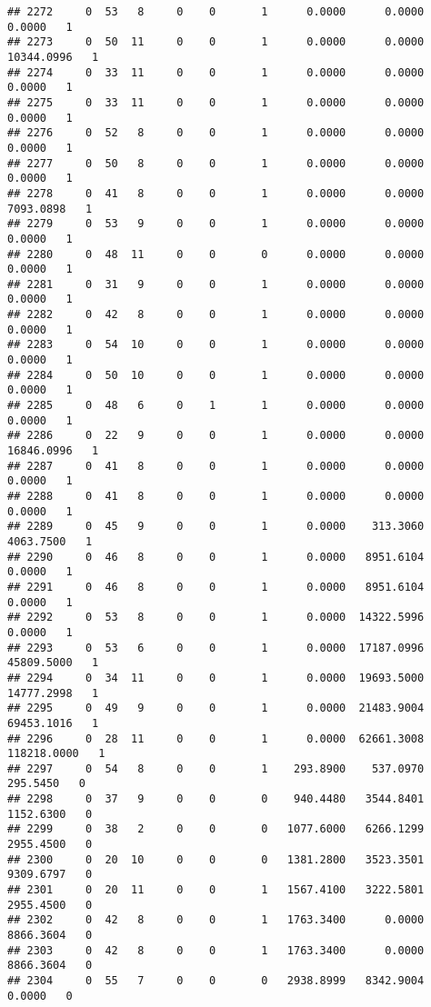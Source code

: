 \documentclass[
]{article}
\begin{document}
\begin{enumerate}
\begin{verbatim}
## 2272     0  53   8     0    0       1      0.0000      0.0000      0.0000   1
## 2273     0  50  11     0    0       1      0.0000      0.0000  10344.0996   1
## 2274     0  33  11     0    0       1      0.0000      0.0000      0.0000   1
## 2275     0  33  11     0    0       1      0.0000      0.0000      0.0000   1
## 2276     0  52   8     0    0       1      0.0000      0.0000      0.0000   1
## 2277     0  50   8     0    0       1      0.0000      0.0000      0.0000   1
## 2278     0  41   8     0    0       1      0.0000      0.0000   7093.0898   1
## 2279     0  53   9     0    0       1      0.0000      0.0000      0.0000   1
## 2280     0  48  11     0    0       0      0.0000      0.0000      0.0000   1
## 2281     0  31   9     0    0       1      0.0000      0.0000      0.0000   1
## 2282     0  42   8     0    0       1      0.0000      0.0000      0.0000   1
## 2283     0  54  10     0    0       1      0.0000      0.0000      0.0000   1
## 2284     0  50  10     0    0       1      0.0000      0.0000      0.0000   1
## 2285     0  48   6     0    1       1      0.0000      0.0000      0.0000   1
## 2286     0  22   9     0    0       1      0.0000      0.0000  16846.0996   1
## 2287     0  41   8     0    0       1      0.0000      0.0000      0.0000   1
## 2288     0  41   8     0    0       1      0.0000      0.0000      0.0000   1
## 2289     0  45   9     0    0       1      0.0000    313.3060   4063.7500   1
## 2290     0  46   8     0    0       1      0.0000   8951.6104      0.0000   1
## 2291     0  46   8     0    0       1      0.0000   8951.6104      0.0000   1
## 2292     0  53   8     0    0       1      0.0000  14322.5996      0.0000   1
## 2293     0  53   6     0    0       1      0.0000  17187.0996  45809.5000   1
## 2294     0  34  11     0    0       1      0.0000  19693.5000  14777.2998   1
## 2295     0  49   9     0    0       1      0.0000  21483.9004  69453.1016   1
## 2296     0  28  11     0    0       1      0.0000  62661.3008 118218.0000   1
## 2297     0  54   8     0    0       1    293.8900    537.0970    295.5450   0
## 2298     0  37   9     0    0       0    940.4480   3544.8401   1152.6300   0
## 2299     0  38   2     0    0       0   1077.6000   6266.1299   2955.4500   0
## 2300     0  20  10     0    0       0   1381.2800   3523.3501   9309.6797   0
## 2301     0  20  11     0    0       1   1567.4100   3222.5801   2955.4500   0
## 2302     0  42   8     0    0       1   1763.3400      0.0000   8866.3604   0
## 2303     0  42   8     0    0       1   1763.3400      0.0000   8866.3604   0
## 2304     0  55   7     0    0       0   2938.8999   8342.9004      0.0000   0

\end{verbatim}
\end{enumerate}
\end{document}
